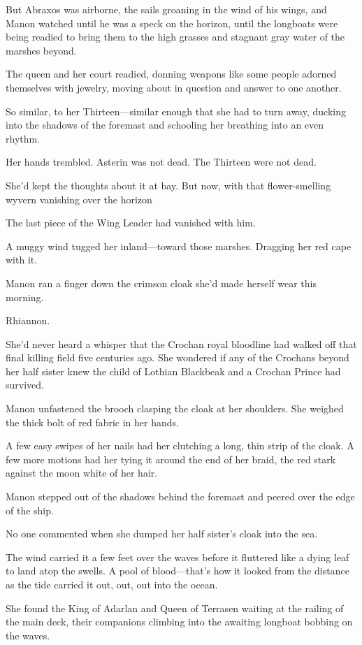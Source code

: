 But Abraxos was airborne, the sails groaning in the wind of his wings, and Manon watched until he was a speck on the horizon, until the longboats were being readied to bring them to the high grasses and stagnant gray water of the marshes beyond.

The queen and her court readied, donning weapons like some people adorned themselves with jewelry, moving about in question and answer to one another.

So similar, to her Thirteen---similar enough that she had to turn away, ducking into the shadows of the foremast and schooling her breathing into an even rhythm.

Her hands trembled.
Asterin was not dead.
The Thirteen were not dead.

She'd kept the thoughts about it at bay.
But now, with that flower-smelling wyvern vanishing over the horizon 

The last piece of the Wing Leader had vanished with him.

A muggy wind tugged her inland---toward those marshes.
Dragging her red cape with it.

Manon ran a finger down the crimson cloak she'd made herself wear this morning.

Rhiannon.

She'd never heard a whisper that the Crochan royal bloodline had walked off that final killing field five centuries ago.
She wondered if any of the Crochans beyond her half sister knew the child of Lothian Blackbeak and a Crochan Prince had survived.

Manon unfastened the brooch clasping the cloak at her shoulders.
She weighed the thick bolt of red fabric in her hands.

A few easy swipes of her nails had her clutching a long, thin strip of the cloak.
A few more motions had her tying it around the end of her braid, the red stark against the moon white of her hair.

Manon stepped out of the shadows behind the foremast and peered over the edge of the ship.

No one commented when she dumped her half sister's cloak into the sea.

The wind carried it a few feet over the waves before it fluttered like a dying leaf to land atop the swells.
A pool of blood---that's how it looked from the distance as the tide carried it out, out, out into the ocean.

She found the King of Adarlan and Queen of Terrasen waiting at the railing of the main deck, their companions climbing into the awaiting longboat bobbing on the waves.

